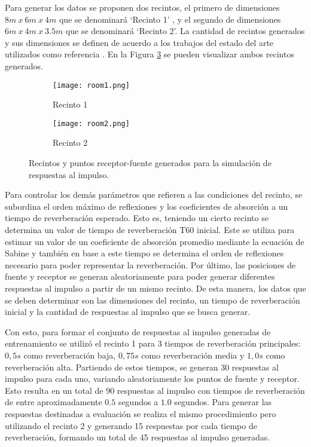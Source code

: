 Para generar los datos se proponen dos recintos, el primero de dimensiones $8m\: x\: 6m\: x\: 4m$ que se denominará `Recinto 1' , y el segundo de dimensiones $6m\: x\: 4m\: x\: 3.5m$ que se denominará `Recinto 2'. La cantidad de recintos generados y sus dimensiones se definen de acuerdo a los trabajos del estado del arte utilizados como referencia \cite{rir_filtinverso, FCN}.  En la Figura \ref{fig:recintos} se pueden visualizar ambos recintos generados. 

\begin{figure}[H]
\centering
\begin{subfigure}{.5\textwidth}
  \centering
  \texttt{[image: room1.png]}
  \caption{Recinto 1}
  \label{fig:sub1}
\end{subfigure}%
\begin{subfigure}{.5\textwidth}
  \centering
  \texttt{[image: room2.png]}
  \caption{Recinto 2}
  \label{fig:sub2}
\end{subfigure}
\caption{Recintos y puntos receptor-fuente generados para la simulación de respuestas al impulso.}
\label{fig:recintos}
\end{figure}

Para controlar los demás parámetros que refieren a las condiciones del recinto, se subordina el orden máximo de reflexiones y los coeficientes de absorción a un tiempo de reverberación esperado. Esto es, teniendo un cierto recinto se determina un valor de tiempo de reverberación T60 inicial. Este se utiliza para estimar un valor de un coeficiente de absorción promedio mediante la ecuación de Sabine y también en base a este tiempo se determina el orden de reflexiones necesario para poder representar la reverberación. 
Por último, las posiciones de fuente y receptor se generan aleatoriamente para poder generar diferentes respuestas al impulso a partir de un mismo recinto. De esta manera, los datos que se deben determinar son las dimensiones del recinto, un tiempo de reverberación inicial y la cantidad de respuestas al impulso que se busca generar. 

Con esto, para formar el conjunto de respuestas al impulso generadas de entrenamiento se utilizó el recinto 1 para 3 tiempos de reverberación principales: $0,5 s$ como reverberación baja, $0,75 s$ como reverberación media y $1,0 s$ como reverberación alta. Partiendo de estos tiempos, se generan 30 respuestas al impulso para cada uno, variando aleatoriamente los puntos de fuente y receptor. Esto resulta en un total de 90 respuestas al impulso con tiempos de reverberación de entre aproximadamente $0.5$ segundos a $1.0$ segundos. Para generar las respuestas destinadas a evaluación se realiza el mismo procedimiento pero utilizando el recinto 2 y generando 15 respuestas por cada tiempo de reverberación, formando un total de 45 respuestas al impulso generadas. 

